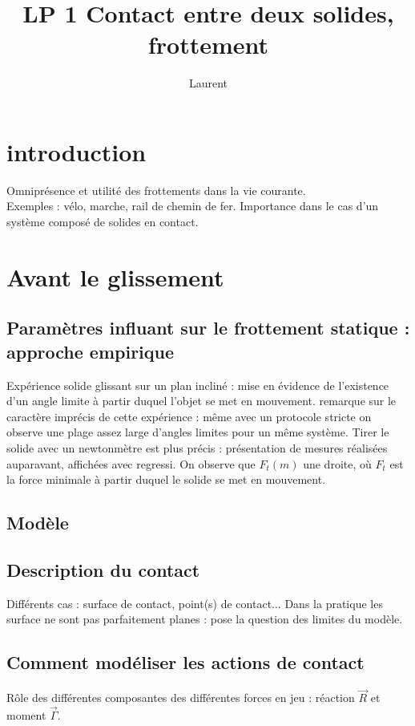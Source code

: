 \documentclass[12pt,prb,aps,epsf]{report}
\begin{document}
	
	\title{LP 1 Contact entre deux solides, frottement}
	\author{Laurent}
	
	\maketitle
	
	\tableofcontents
	
	\pagebreak
	
\section*{introduction}
Omniprésence et utilité des frottements dans la vie courante.\\
Exemples : vélo, marche, rail de chemin de fer. Importance dans le cas d'un système composé de solides en contact.

\section{Avant le glissement}
\subsection{Paramètres influant sur le frottement statique : approche empirique}
Expérience solide glissant sur un plan incliné : mise en évidence de l'existence d'un angle limite à partir duquel l'objet se met en mouvement. remarque sur le caractère imprécis de cette expérience : même avec un protocole stricte on observe une plage assez large d'angles limites pour un même système. Tirer le solide avec un newtonmètre est plus précis : présentation de mesures réalisées auparavant, affichées avec regressi. On observe que $F_t(m)$ une droite, où $F_t$ est la force minimale à partir duquel le solide se met en mouvement.
\subsection{Modèle}
\subsection{Description du contact}
Différents cas : surface de contact, point(s) de contact... Dans la pratique les surface ne sont pas parfaitement planes : pose la question des limites du modèle.

\subsection{Comment modéliser les actions de contact}
Rôle des différentes composantes des différentes forces en jeu : réaction $\vec{R}$ et moment $\vec{\Gamma}$.
\end{document}
